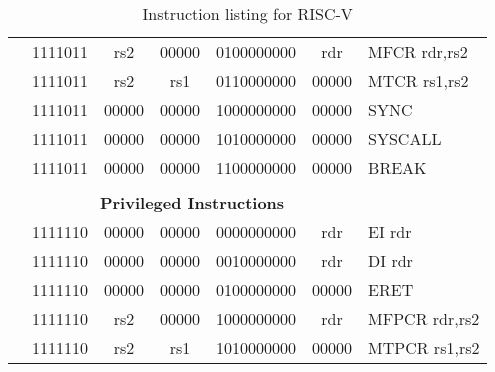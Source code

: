 \begin{table}[p]
\begin{small}
\begin{center}
\begin{tabular}{rcccccccccl}
&
\multicolumn{2}{|c|}{1111011} &
\multicolumn{1}{c|}{rs2} &
\multicolumn{1}{c|}{00000} &
\multicolumn{4}{c|}{0100000000} &
\multicolumn{1}{c|}{rdr} & MFCR rdr,rs2 \\
\cline{2-10}
  

&
\multicolumn{2}{|c|}{1111011} &
\multicolumn{1}{c|}{rs2} &
\multicolumn{1}{c|}{rs1} &
\multicolumn{4}{c|}{0110000000} &
\multicolumn{1}{c|}{00000} & MTCR rs1,rs2 \\
\cline{2-10}
  

&
\multicolumn{2}{|c|}{1111011} &
\multicolumn{1}{c|}{00000} &
\multicolumn{1}{c|}{00000} &
\multicolumn{4}{c|}{1000000000} &
\multicolumn{1}{c|}{00000} & SYNC  \\
\cline{2-10}
  

&
\multicolumn{2}{|c|}{1111011} &
\multicolumn{1}{c|}{00000} &
\multicolumn{1}{c|}{00000} &
\multicolumn{4}{c|}{1010000000} &
\multicolumn{1}{c|}{00000} & SYSCALL  \\
\cline{2-10}
  

&
\multicolumn{2}{|c|}{1111011} &
\multicolumn{1}{c|}{00000} &
\multicolumn{1}{c|}{00000} &
\multicolumn{4}{c|}{1100000000} &
\multicolumn{1}{c|}{00000} & BREAK  \\
\cline{2-10}
  

&
\multicolumn{9}{c}{} & \\
&
\multicolumn{9}{c}{\bf Privileged Instructions} & \\
\cline{2-10}
  

&
\multicolumn{2}{|c|}{1111110} &
\multicolumn{1}{c|}{00000} &
\multicolumn{1}{c|}{00000} &
\multicolumn{4}{c|}{0000000000} &
\multicolumn{1}{c|}{rdr} & EI rdr \\
\cline{2-10}
  

&
\multicolumn{2}{|c|}{1111110} &
\multicolumn{1}{c|}{00000} &
\multicolumn{1}{c|}{00000} &
\multicolumn{4}{c|}{0010000000} &
\multicolumn{1}{c|}{rdr} & DI rdr \\
\cline{2-10}
  

&
\multicolumn{2}{|c|}{1111110} &
\multicolumn{1}{c|}{00000} &
\multicolumn{1}{c|}{00000} &
\multicolumn{4}{c|}{0100000000} &
\multicolumn{1}{c|}{00000} & ERET  \\
\cline{2-10}
  

&
\multicolumn{2}{|c|}{1111110} &
\multicolumn{1}{c|}{rs2} &
\multicolumn{1}{c|}{00000} &
\multicolumn{4}{c|}{1000000000} &
\multicolumn{1}{c|}{rdr} & MFPCR rdr,rs2 \\
\cline{2-10}
  

&
\multicolumn{2}{|c|}{1111110} &
\multicolumn{1}{c|}{rs2} &
\multicolumn{1}{c|}{rs1} &
\multicolumn{4}{c|}{1010000000} &
\multicolumn{1}{c|}{00000} & MTPCR rs1,rs2 \\
\cline{2-10}
  

\end{tabular}
\end{center}
\end{small}
\caption{Instruction listing for RISC-V}
\label{instr-table}
\end{table}
  
